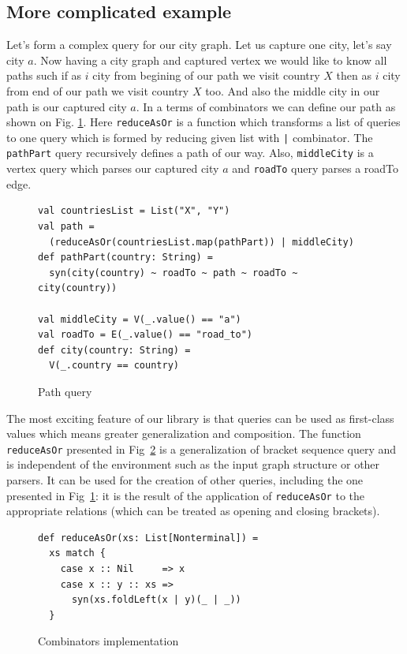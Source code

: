\subsection{More complicated example}
Let's form a complex query for our city graph. Let us capture one city, let's say city $a$. Now having a city graph and captured vertex we would like to know all paths such if as $i$ city from begining of our path we visit country $X$ then as $i$ city from end of our path we visit country $X$ too. And also the middle city in our path is our captured city $a$.
In a terms of combinators we can define our path as shown on Fig. \ref{fig:pathQuery}. Here \lstinline{reduceAsOr} is a function which transforms a list of queries to one query which is formed by reducing given list with \lstinline{|} combinator. The \lstinline{pathPart} query recursively defines a path of our way. Also, \lstinline{middleCity} is a vertex query which parses our captured city $a$ and \lstinline{roadTo} query parses a roadTo edge.

\begin{figure}[h]
\begin{lstlisting}
val countriesList = List("X", "Y")
val path = 
  (reduceAsOr(countriesList.map(pathPart)) | middleCity)
def pathPart(country: String) =
  syn(city(country) ~ roadTo ~ path ~ roadTo ~ city(country))

val middleCity = V(_.value() == "a")
val roadTo = E(_.value() == "road_to")
def city(country: String) =
  V(_.country == country)
\end{lstlisting}
\caption{Path query}
\label{fig:pathQuery}
\end{figure}


The most exciting feature of our library is that queries can be used as first-class values which means greater generalization and composition. 
The function \lstinline{reduceAsOr} presented in Fig~\ref{fig:reduceAsOr} is a generalization of bracket sequence query and is independent of the environment such as the input graph structure or other parsers.
It can be used for the creation of other queries, including the one presented in Fig~\ref{fig:pathQuery}: it is the result of the application of \lstinline{reduceAsOr} to the appropriate relations (which can be treated as opening and closing brackets).

\begin{figure}[h]
\begin{lstlisting}
def reduceAsOr(xs: List[Nonterminal]) = 
  xs match {
    case x :: Nil     => x
    case x :: y :: xs => 
      syn(xs.foldLeft(x | y)(_ | _))
  }
\end{lstlisting}
\caption{Combinators implementation}
\label{fig:reduceAsOr}
\end{figure}

